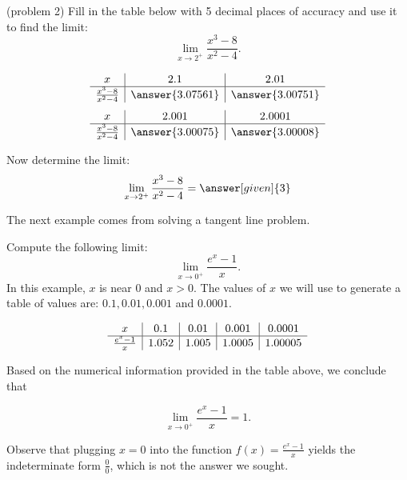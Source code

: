\documentclass{ximera}
\begin{document}
\begin{problem}(problem 2)
Fill in the table below with 5 decimal places of accuracy and use it to find the limit:
\[\lim_{x \to 2^+} \frac{x^3 - 8}{x^2 - 4}.\]

\begin{prompt}
\begin{center}
\[
\begin{array}{ c | c | c }
  x & 2.1 & 2.01   \\ 
	\hline 
	 \frac{x^3 - 8}{x^2 - 4} & \answer{3.07561} & \answer{3.00751} 
\end{array}
\]
\[
\begin{array}{ c | c | c  }
  x  & 2.001 & 2.0001 \\ 
	\hline 
	 \frac{x^3 - 8}{x^2 - 4}  & \answer{3.00075} & \answer{3.00008}
\end{array}
\]
\end{center}
Now determine the limit:
\[
\lim_{x \to 2^+} \frac{x^3 - 8}{x^2 - 4} = \answer[given]{3}
\]
\end{prompt}
\end{problem}


The next example comes from solving a tangent line problem.



\begin{example}[example 3]
Compute the following limit:
\[\lim_{x \to 0^{+}} \frac{e^x-1}{x}.\]
In this example, $x$ is near $0$ and $x>0$.  The values of $x$ we will use to 
generate a table of values are: $0.1, 0.01, 0.001$ and $0.0001.$

\[
\begin{array}{ c | c | c | c | c }
  x & 0.1 & 0.01  & 0.001 & 0.0001 \\ 
	\hline
	 \frac{e^x - 1}{x} & 1.052 & 1.005 & 1.0005 & 1.00005
\end{array}
\]

Based on the numerical information provided in the table above, we conclude that 

\[\lim_{x \to 0^+} \frac{e^x - 1}{x} = 1.\]


Observe that plugging $x=0$ into the 
function $\displaystyle{f(x)= \frac{e^x -1}{x}}$ yields the indeterminate form $\frac{0}{0}$, which is not
the answer we sought.

\end{example}
\end{document}
